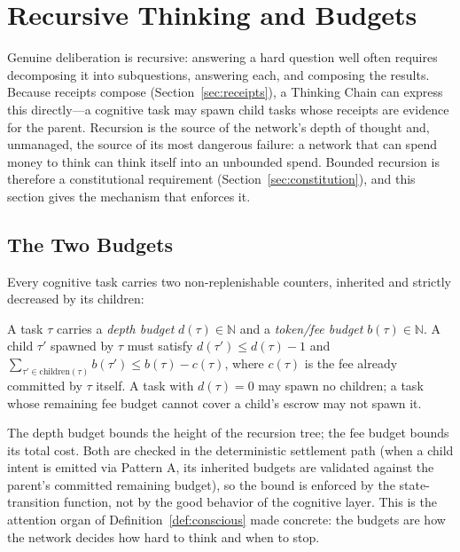 \section{Recursive Thinking and Budgets}
\label{sec:recursion}

Genuine deliberation is recursive: answering a hard question well often requires decomposing it into subquestions, answering each, and composing the results. Because \PoT{} receipts compose (Section~\ref{sec:receipts}), a Thinking Chain can express this directly---a cognitive task may spawn child tasks whose receipts are evidence for the parent. Recursion is the source of the network's depth of thought and, unmanaged, the source of its most dangerous failure: a network that can spend money to think can think itself into an unbounded spend. Bounded recursion is therefore a constitutional requirement (Section~\ref{sec:constitution}), and this section gives the mechanism that enforces it.

\subsection{The Two Budgets}

Every cognitive task carries two non-replenishable counters, inherited and strictly decreased by its children:

\begin{definition}
\label{def:budget}
A task $\tau$ carries a \emph{depth budget} $d(\tau) \in \mathbb{N}$ and a \emph{token/fee budget} $b(\tau) \in \mathbb{N}$. A child $\tau'$ spawned by $\tau$ must satisfy $d(\tau') \le d(\tau) - 1$ and $\sum_{\tau' \in \mathrm{children}(\tau)} b(\tau') \le b(\tau) - c(\tau)$, where $c(\tau)$ is the fee already committed by $\tau$ itself. A task with $d(\tau) = 0$ may spawn no children; a task whose remaining fee budget cannot cover a child's escrow may not spawn it.
\end{definition}

The depth budget bounds the height of the recursion tree; the fee budget bounds its total cost. Both are checked in the deterministic settlement path (when a child intent is emitted via Pattern A, its inherited budgets are validated against the parent's committed remaining budget), so the bound is enforced by the state-transition function, not by the good behavior of the cognitive layer. This is the attention organ of Definition~\ref{def:conscious} made concrete: the budgets are how the network decides how hard to think and when to stop.

